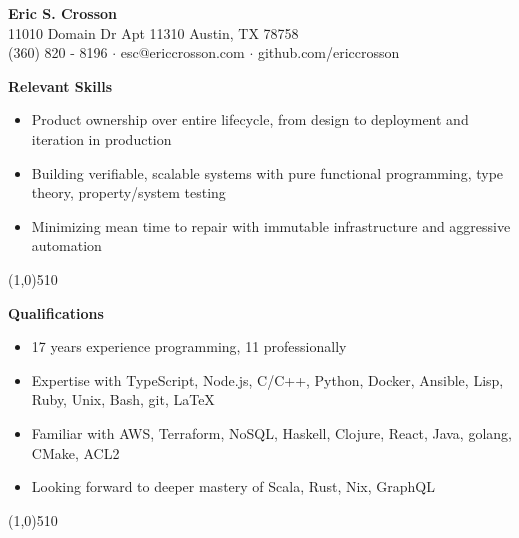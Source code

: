\documentclass{report}
\newcommand{\cut}{\begin{center} \line(1,0){510} \end{center}}
\begin{document}
\pagestyle{empty}
\setlength\parindent{0pt}

\begin{center}
  \textbf{Eric S. Crosson} \\
  11010 Domain Dr Apt 11310 Austin, TX 78758 \\
  (360) 820 - 8196 $\cdot$ esc@ericcrosson.com $\cdot$ github.com/ericcrosson
\end{center}

% 

\textbf{Relevant Skills}
\begin{itemize}[label=$\cdot$]
\item Product ownership over entire lifecycle, from design to deployment and iteration in production
\item Building verifiable, scalable systems with pure functional programming, type theory, property/system testing
\item Minimizing mean time to repair with immutable infrastructure and aggressive automation 
\end{itemize}

\cut{}

\textbf{Qualifications}
\begin{itemize}[label=$\cdot$]
\item 17 years experience programming, 11 professionally
\item Expertise with TypeScript, Node.js, C/C++, Python, Docker, Ansible, Lisp, Ruby, Unix, Bash, git, \LaTeX{}
\item Familiar with AWS, Terraform, NoSQL, Haskell, Clojure, React, Java, golang, CMake, ACL2
\item Looking forward to deeper mastery of Scala, Rust, Nix, GraphQL
\end{itemize}

\cut{}
\end{document}
